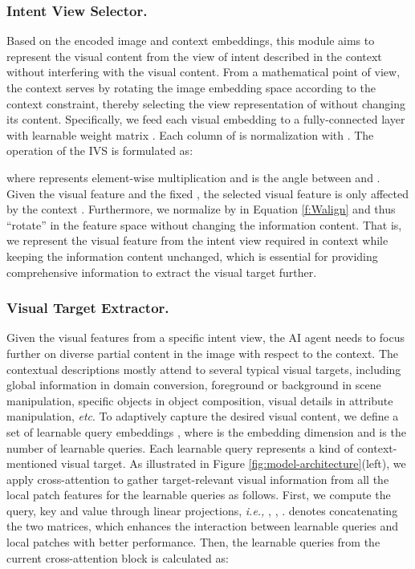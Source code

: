 \documentclass[letterpaper]{article} \usepackage{aaai24}  \usepackage{times}  \usepackage{helvet}  \usepackage{courier}  \usepackage[hyphens]{url}  \usepackage{graphicx} \urlstyle{rm} \def\UrlFont{\rm}  \usepackage{natbib}  \usepackage{caption} \frenchspacing  \setlength{\pdfpagewidth}{8.5in} \setlength{\pdfpageheight}{11in} \usepackage{algorithm}
\begin{document}
\subsubsection{Intent View Selector.} Based on the encoded image and context embeddings, this module aims to represent the visual content from the view of intent described in the context without interfering with the visual content. From a mathematical point of view, the context serves by rotating the image embedding space according to the context constraint, thereby selecting the view representation of  without changing its content. Specifically, we feed each visual embedding  to a fully-connected layer with learnable weight matrix . Each column of  is normalization with . The operation of the IVS is formulated as: 

\noindent where  represents element-wise multiplication and  is the angle between  and . Given the visual feature  and the fixed , the selected visual feature  is only affected by the context . Furthermore, we normalize  by  in Equation \ref{f:Walign} and thus ``rotate''  in the feature space without changing the information content. That is, we represent the visual feature from the intent view required in context while keeping the information content unchanged, which is essential for providing comprehensive information to extract the visual target further.  



\subsubsection{Visual Target Extractor.}  Given the visual features from a specific intent view, the AI agent needs to focus further on diverse partial content in the image with respect to the context. The contextual descriptions mostly attend to several typical visual targets, including global information in domain conversion, foreground or background in scene manipulation, specific objects in object composition, visual details in attribute manipulation, \textit{etc}. To adaptively capture the desired visual content, we define a set of learnable query embeddings  , where  is the embedding dimension and  is the number of learnable queries. Each learnable query  represents a kind of context-mentioned visual target. As illustrated in Figure \ref{fig:model-architecture}(left), we apply cross-attention to gather target-relevant visual information from all the local patch features  for the learnable queries  as follows. First, we compute the query, key and value through linear projections, \textit{i.e.,} , , .   denotes concatenating the two matrices, which enhances the interaction between learnable queries and local patches with better performance. Then, the learnable queries from the current cross-attention block  is calculated as:
\end{document}

